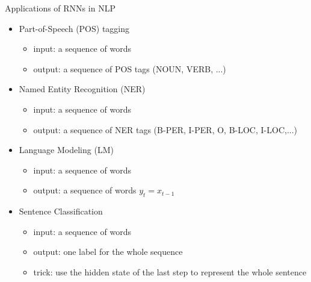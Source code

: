 \begin{frame}{Applications of RNNs in NLP}
    \begin{itemize}
        \item Part-of-Speech (POS) tagging
        \begin{itemize}
            \item input: a sequence of words 
            \item output: a sequence of POS tags (NOUN, VERB, ...)
        \end{itemize}
        \item Named Entity Recognition (NER)
        \begin{itemize}
            \item input: a sequence of words 
            \item output: a sequence of NER tags (B-PER, I-PER, O, B-LOC, I-LOC,...)
        \end{itemize}
        \item Language Modeling (LM)
        \begin{itemize}
            \item input: a sequence of words 
            \item output: a sequence of words $y_t = x_{t-1}$
        \end{itemize}
        
        \item Sentence Classification
        \begin{itemize}
            \item input: a sequence of words 
            \item output: one label for the whole sequence
            \item trick: use the hidden state of the last step to represent the whole sentence  
        \end{itemize}
    \end{itemize}
\end{frame}
